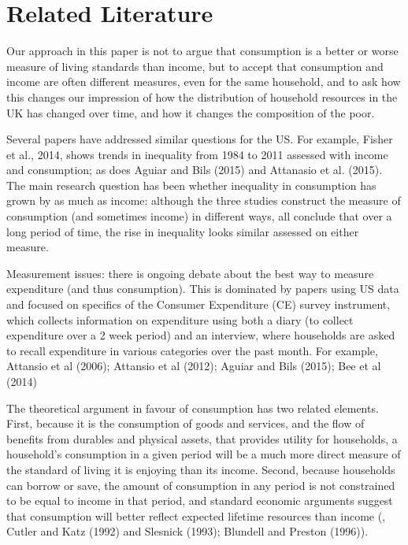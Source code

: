 \section{Related Literature}\label{sec:literature}


Our approach in this paper is not to argue that consumption is a better or worse measure of living standards than income, but to accept that consumption and income are often different measures, even for the same household, and to ask how this changes our impression of how the distribution of household resources in the UK has changed over time, and how it changes the composition of the poor. 

Several papers have addressed similar questions for the US. For example, Fisher et al., 2014, shows trends in inequality from 1984 to 2011 assessed with income and consumption; as does Aguiar and Bils (2015) and Attanasio et al. (2015). The main research question has been whether inequality in consumption has grown by as much as income: although the three studies construct the measure of consumption (and sometimes income) in different ways, all conclude that over a long period of time, the rise in inequality looks similar assessed on either measure.


Measurement issues: there is ongoing debate about the best way to measure expenditure (and thus consumption). This is dominated by papers using US data and focused on specifics of the Consumer Expenditure (CE) survey instrument, which collects information on expenditure using both a diary (to collect expenditure over a 2 week period) and an interview, where households are asked to recall expenditure in various categories over the past month.  For example, Attansio et al (2006); Attansio et al (2012); Aguiar and Bils (2015); Bee et al (2014)


The theoretical argument in favour of consumption has two related elements. First, because it is the consumption of goods and services, and the flow of benefits from durables and physical assets, that provides utility for households, a household's consumption in a given period will be a much more direct measure of the standard of living it is enjoying than its income. Second, because households can borrow or save, the amount of consumption in any period is not constrained to be equal to income in that period, and standard economic arguments suggest that consumption will better reflect expected lifetime resources than income (\cite{Poterba1989}, Cutler and Katz (1992) and Slesnick (1993); Blundell and Preston (1996)).

